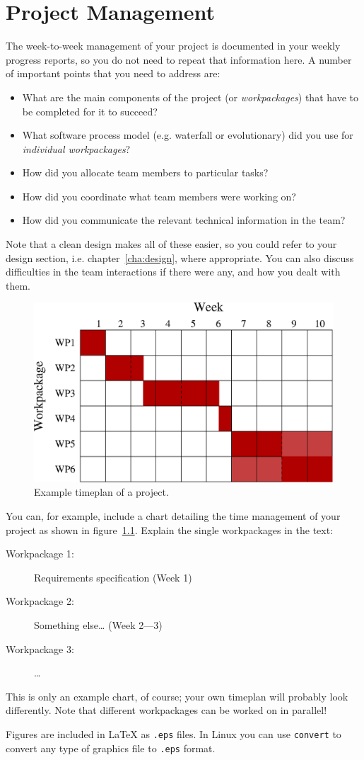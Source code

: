
\chapter{Project Management}
\label{cha:management}

The week-to-week management of your project is documented in your weekly
progress reports, so you do not need to repeat that information here. A number
of important points that you need to address are:
\begin{itemize}
\item What are the main components of the project (or \emph{workpackages}) that have to be completed for it to succeed?
\item What software process model (e.g. waterfall or evolutionary)
did you use for \emph{individual workpackages}?
\item How did you allocate team members to particular tasks?
\item How did you coordinate what team members were working on?
\item How did you communicate the relevant technical information in the
team?
\end{itemize}
Note that a clean design makes all of these easier, so you could
refer to your design section, i.e. chapter~\ref{cha:design}, where
appropriate. You can also discuss difficulties in the team
interactions if there were any, and how you dealt with them.

\begin{figure}
  \centering
  \includegraphics[width=.5\textwidth]{gant}
  \caption{Example timeplan of a project.}
  \label{fig:timeplan}
\end{figure}
You can, for example, include a chart detailing the time management of your
project as shown in figure~\ref{fig:timeplan}. Explain the single workpackages
in the text:
\begin{description}
\item[Workpackage 1:] Requirements specification
  \hfill (Week 1)
\item[Workpackage 2:] Something else\ldots
  \hspace*{\fill} (Week 2---3)
\item[Workpackage 3:] \ldots
\end{description}
This is only an example chart, of course; your own timeplan will
probably look differently. Note that different workpackages can be
worked on in parallel!

Figures are included in {\LaTeX} as \texttt{.eps} files. In Linux
you can use \texttt{convert} to convert any type of graphics file to
\texttt{.eps} format.

